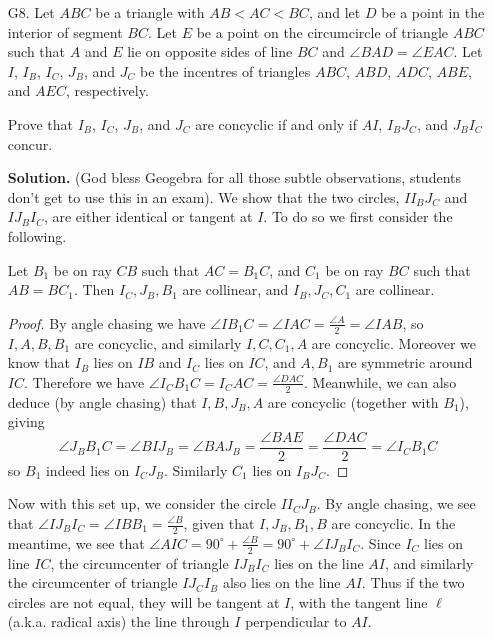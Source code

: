 \documentclass[11pt,a4paper]{article}
\begin{document}
\begin{enumerate}
    	\item [G8.] 
    	Let $ABC$ be a triangle with $AB<AC<BC$, and let $D$ be a point in the interior of segment $BC$. Let $E$ be a point on the circumcircle of triangle $ABC$ such that $A$ and $E$ lie on opposite sides of line $BC$ and $\angle BAD=\angle EAC$. Let $I$, $I_B$, $I_C$, $J_B$, and $J_C$ be the incentres of triangles $ABC$, $ABD$, $ADC$, $ABE$, and $AEC$, respectively.
    	
    	Prove that $I_B$, $I_C$, $J_B$, and $J_C$ are concyclic if and only if $AI$, $I_BJ_C$, and $J_BI_C$ concur.
    	
    	\textbf{Solution.} (God bless Geogebra for all those subtle observations, students don't get to use this in an exam). 
    	We show that the two circles, $II_BJ_C$ and $IJ_BI_C$, 
    	are either identical or tangent at $I$. 
    	To do so we first consider the following. 
    	\begin{lemma}
    		Let $B_1$ be on ray $CB$ such that $AC=B_1C$, 
    		and $C_1$ be on ray $BC$ such that $AB=BC_1$. 
    		Then $I_C, J_B, B_1$ are collinear, 
    		and $I_B, J_C, C_1$ are collinear. 
    	\end{lemma}
    	\begin{proof}
    		By angle chasing we have $\angle IB_1C=\angle IAC= \frac{\angle A}{2}=\angle IAB$, 
    		so $I, A, B, B_1$ are concyclic, 
    		and similarly $I, C, C_1, A$ are concyclic. 
    		Moreover we know that $I_B$ lies on $IB$ and $I_C$ lies on $IC$, 
    		and $A, B_1$ are symmetric around $IC$. 
    		Therefore we have 
    		$\angle I_CB_1C=I_CAC=\frac{\angle DAC}{2}$. 
    		Meanwhile, we can also deduce (by angle chasing) that 
    		$I, B, J_B, A$ are concyclic (together with $B_1$), 
    		giving 
    		\[
    		\angle J_BB_1C=\angle BIJ_B=\angle BAJ_B=\frac{\angle BAE}{2}=\frac{\angle DAC}{2}=\angle I_CB_1C
    		\]
    		so $B_1$ indeed lies on $I_CJ_B$. 
    		Similarly $C_1$ lies on $I_BJ_C$. 
    	\end{proof}
    	
    	Now with this set up, we consider the circle $II_CJ_B$. 
    	By angle chasing, we see that $\angle IJ_BI_C=\angle IBB_1=\frac{\angle B}{2}$, 
    	given that $I, J_B, B_1, B$ are concyclic. 
    	In the meantime, we see that $\angle AIC=90^{\circ}+\frac{\angle B}{2}=90^{\circ}+\angle IJ_BI_C$. 
    	Since $I_C$ lies on line $IC$, 
    	the circumcenter of triangle $IJ_BI_C$ lies on the line $AI$, 
    	and similarly the circumcenter of triangle $IJ_CI_B$ also lies on the line $AI$. 
    	Thus if the two circles are not equal, 
    	they will be tangent at $I$, with the tangent line $\ell$ (a.k.a. radical axis) the line through $I$ perpendicular to $AI$. 
    	

\end{enumerate}
\end{document}
